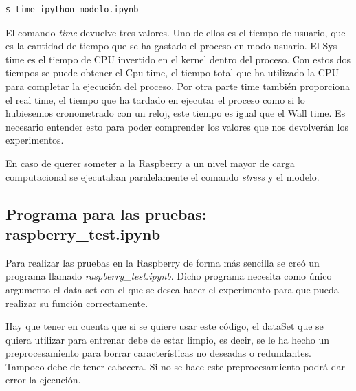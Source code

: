 \documentclass[a4paper, 12pt]{book}
\begin{document}
\begin{lstlisting}[language=bash]
  $ time ipython modelo.ipynb
\end{lstlisting}

El comando \textit{time} devuelve tres valores. Uno de ellos es el tiempo de usuario, que es la cantidad de tiempo que se ha gastado el proceso en modo usuario. El Sys time es el tiempo de CPU invertido en el kernel dentro del proceso. Con estos dos tiempos se puede obtener el Cpu time, el tiempo total que ha utilizado la CPU para completar la ejecución del proceso. Por otra parte time también proporciona el real time, el tiempo que ha tardado en ejecutar el proceso como si lo hubiesemos cronometrado con un reloj, este tiempo es igual que el Wall time. Es necesario entender esto para poder comprender los valores que nos devolverán los experimentos.

En caso de querer someter a la Raspberry a un nivel mayor de carga computacional se ejecutaban paralelamente el comando \textit{stress} y el modelo.


\subsection{Programa para las pruebas: raspberry\_test.ipynb}
\label{subsec:programa_pruebas_raspberry}

Para realizar las pruebas en la Raspberry de forma más sencilla se creó un programa llamado \textit{raspberry\_test.ipynb}. Dicho programa necesita como único argumento el data set con el que se desea hacer el experimento para que pueda realizar su función correctamente.

Hay que tener en cuenta que si se quiere usar este código, el dataSet que se quiera utilizar para entrenar debe de estar limpio, es decir, se le ha hecho un preprocesamiento para borrar características no deseadas o redundantes. Tampoco debe de tener cabecera. Si no se hace este preprocesamiento podrá dar error la ejecución.
\end{document}
